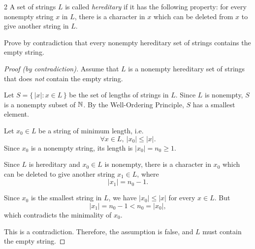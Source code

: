 \documentclass[11pt]{article}
\begin{document}
\begin{exercise}{2}
    A set of strings $L$ is called \emph{hereditary} if it has the
    following property: for every nonempty string $x$ in $L$, there is
    a character in $x$ which can be deleted from $x$ to give another
    string in $L$.

    Prove by contradiction that every nonempty hereditary set of
    strings contains the empty string.
\end{exercise}
\begin{proof}[Proof (by contradiction)]
    Assume that $L$ is a nonempty hereditary set of strings that does
    \emph{not} contain the empty string.

    Let $S = \{\,|x| : x \in L\,\}$ be the set of lengths of strings
    in $L$. Since $L$ is nonempty, $S$ is a nonempty subset of $\mathbb{N}$.
    By the Well-Ordering Principle, $S$ has a smallest element.

    Let $x_0 \in L$ be a string of minimum length, i.e.
    \[
        \forall x \in L,\ |x_0| \le |x|.
    \]
    Since $x_0$ is a nonempty string, its length is
    $|x_0| = n_0 \ge 1$.

    Since $L$ is hereditary and $x_0 \in L$ is nonempty, there is a
    character in $x_0$ which can be deleted to give another string
    $x_1 \in L$, where
    \[
        |x_1| = n_0 - 1.
    \]

    Since $x_0$ is the smallest string in $L$, we have
    $|x_0| \le |x|$ for every $x \in L$. But
    \[
        |x_1| = n_0 - 1 < n_0 = |x_0|,
    \]
    which contradicts the minimality of $x_0$.

    This is a contradiction. Therefore, the assumption is false, and
    $L$ must contain the empty string.
\end{proof}
\end{document}
